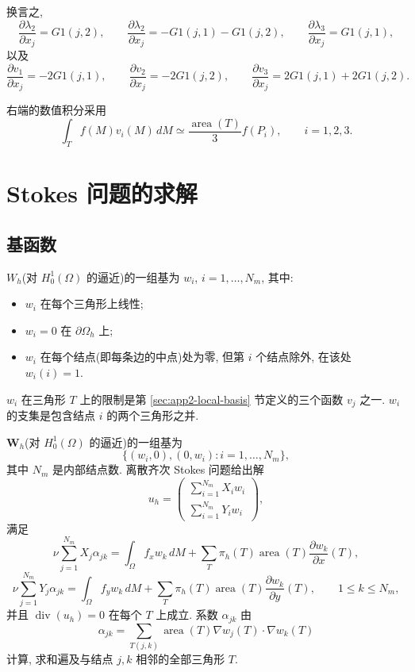 \hypertarget{appendix-02-page-344}{}
换言之,
\[
\frac{\partial\lambda_2}{\partial x_j}=G1(j,2),
\qquad
\frac{\partial\lambda_2}{\partial x_j}=-G1(j,1)-G1(j,2),
\qquad
\frac{\partial\lambda_3}{\partial x_j}=G1(j,1),
\]
以及
\[
\frac{\partial v_1}{\partial x_j}=-2G1(j,1),
\qquad
\frac{\partial v_2}{\partial x_j}=-2G1(j,2),
\qquad
\frac{\partial v_3}{\partial x_j}=2G1(j,1)+2G1(j,2).
\]

右端的数值积分采用
\[
\int_Tf(M)v_i(M)\,dM
\simeq\frac{\operatorname{area}(T)}3f(P_i),
\qquad i=1,2,3.
\]

\section{Stokes 问题的求解}
\label{sec:app2-stokes-solution}

\subsection{基函数}
\label{subsec:app2-stokes-basis}

$W_h$(对 $H_0^1(\Omega)$ 的逼近)的一组基为 $w_i$, $i=1,\ldots,N_m$, 其中:
\begin{itemize}
\item $w_i$ 在每个三角形上线性;
\item $w_i=0$ 在 $\partial\Omega_h$ 上;
\item $w_i$ 在每个结点(即每条边的中点)处为零, 但第 $i$ 个结点除外, 在该处 $w_i(i)=1$.
\end{itemize}
$w_i$ 在三角形 $T$ 上的限制是第 \ref{sec:app2-local-basis} 节定义的三个函数 $v_j$ 之一. $w_i$ 的支集是包含结点 $i$ 的两个三角形之并.

$\mathbf W_h$(对 $H_0^1(\Omega)$ 的逼近)的一组基为
\[
\{(w_i,0),(0,w_i):i=1,\ldots,N_m\},
\]
其中 $N_m$ 是内部结点数. 离散齐次 Stokes 问题给出解
\[
u_h=
\begin{pmatrix}\displaystyle\sum_{i=1}^{N_m}X_iw_i\\[2mm]
\displaystyle\sum_{i=1}^{N_m}Y_iw_i\end{pmatrix},
\]
满足
\[
\nu\sum_{j=1}^{N_m}X_j\alpha_{jk}
=\int_\Omega f_xw_k\,dM
+\sum_T\pi_h(T)\operatorname{area}(T)\frac{\partial w_k}{\partial x}(T),
\]
\[
\nu\sum_{j=1}^{N_m}Y_j\alpha_{jk}
=\int_\Omega f_yw_k\,dM
+\sum_T\pi_h(T)\operatorname{area}(T)\frac{\partial w_k}{\partial y}(T),
\qquad 1\leq k\leq N_m,
\]
并且 $\operatorname{div}(u_h)=0$ 在每个 $T$ 上成立. 系数 $\alpha_{jk}$ 由
\begin{equation}
\alpha_{jk}=\sum_{T(j,k)}\operatorname{area}(T)\nabla w_j(T)\cdot\nabla w_k(T)
\label{eq:app2-stiffness-coefficients}
\end{equation}
计算, 求和遍及与结点 $j,k$ 相邻的全部三角形 $T$.

